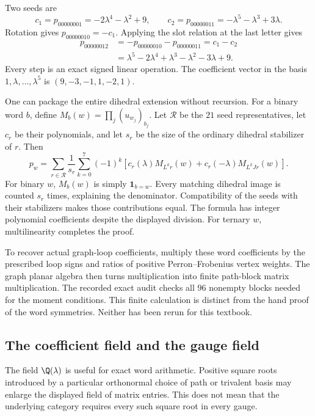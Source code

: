 \begin{example}
Two seeds are
\[
 c_1=p_{00000001}=-2\lambda^4-\lambda^2+9,
 \qquad
 c_2=p_{00000011}=-\lambda^5-\lambda^3+3\lambda.
\]
Rotation gives $p_{00000010}=-c_1$. Applying the slot relation
at the last letter gives
\begin{align*}
 p_{00000012}
 &=-p_{00000010}-p_{00000011}=c_1-c_2\\
 &=\lambda^5-2\lambda^4+\lambda^3-\lambda^2-3\lambda+9.
\end{align*}
Every step is an exact signed linear operation. The coefficient
vector in the basis $1,\lambda,\ldots,\lambda^5$ is
$(9,-3,-1,1,-2,1)$.
\end{example}

One can package the entire dihedral extension without recursion.
For a binary word $b$, define
$M_b(w)=\prod_j(u_{w_j})_{b_j}$.
Let $\mathcal R$ be the $21$ seed representatives, let $c_r$
be their polynomials, and let $s_r$ be the size of the ordinary
dihedral stabilizer of $r$. Then
\begin{equation}
 p_w=\sum_{r\in\mathcal R}\frac1{s_r}\sum_{k=0}^7(-1)^k
 \left[c_r(\lambda)M_{L^kr}(w)
       +c_r(-\lambda)M_{L^kJr}(w)\right].
 \label{eq:EH-orbit-tensor}
\end{equation}
For binary $w$, $M_b(w)$ is simply $\mathbf1_{b=w}$.
Every matching dihedral image is counted $s_r$ times, explaining
the denominator. Compatibility of the seeds with their stabilizers
makes those contributions equal. The formula has integer
polynomial coefficients despite the displayed division. For
ternary $w$, multilinearity completes the proof.

To recover actual graph-loop coefficients, multiply these word
coefficients by the prescribed loop signs and ratios of positive
Perron--Frobenius vertex weights. The graph planar algebra then
turns multiplication into finite path-block matrix multiplication.
The recorded exact audit checks all $96$ nonempty blocks needed
for the moment conditions. This finite calculation is distinct
from the hand proof of the word symmetries. Neither has been
rerun for this textbook.

\subsection{The coefficient field and the gauge field}

The field $\Q(\lambda)$ is useful for exact word arithmetic.
Positive square roots introduced by a particular orthonormal
choice of path or trivalent basis may enlarge the displayed
field of matrix entries. This does not mean that the underlying
category requires every such square root in every gauge.

